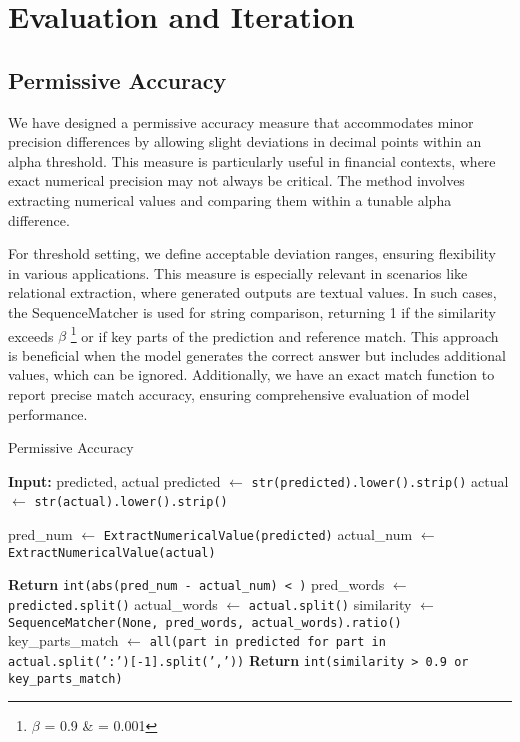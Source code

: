 \documentclass[logo,msc]{infthesis}           %
\begin{document}
\section{Evaluation and Iteration}
\subsection{Permissive Accuracy}
We have designed a permissive accuracy measure that accommodates minor precision differences by allowing slight deviations in decimal points within an alpha threshold. This measure is particularly useful in financial contexts, where exact numerical precision may not always be critical. The method involves extracting numerical values and comparing them within a tunable alpha difference.

For threshold setting, we define acceptable deviation ranges, ensuring flexibility in various applications. This measure is especially relevant in scenarios like relational extraction, where generated outputs are textual values. In such cases, the SequenceMatcher is used for string comparison, returning 1 if the similarity exceeds $\beta$ \footnote{$\beta$ = 0.9 \& \alpha = 0.001}  or if key parts of the prediction and reference match. This approach is beneficial when the model generates the correct answer but includes additional values, which can be ignored. Additionally, we have an exact match function to report precise match accuracy, ensuring comprehensive evaluation of model performance.
\begin{algorithm}
\caption{Permissive Accuracy}
\label{alg:calculate_accuracy_permissive}
\begin{algorithmic}[1]
    \State \textbf{Input:} predicted, actual
    \State predicted $\gets$ \texttt{str(predicted).lower().strip()}
    \State actual $\gets$ \texttt{str(actual).lower().strip()}
    
    \State pred\_num $\gets$ \texttt{ExtractNumericalValue(predicted)}
    \State actual\_num $\gets$ \texttt{ExtractNumericalValue(actual)}
    
        \State \textbf{Return} \texttt{int(abs(pred\_num - actual\_num) < \alpha)}
    \Else
        \State pred\_words $\gets$ \texttt{predicted.split()}
        \State actual\_words $\gets$ \texttt{actual.split()}
        \State similarity $\gets$ \texttt{SequenceMatcher(None, pred\_words, actual\_words).ratio()}
        \State key\_parts\_match $\gets$ \texttt{all(part in predicted for part in actual.split(':')[-1].split(','))}
        \State \textbf{Return} \texttt{int(similarity > 0.9 or key\_parts\_match)}
    \EndIf
\EndFunction
\end{algorithmic}
\end{algorithm}
\end{document}
